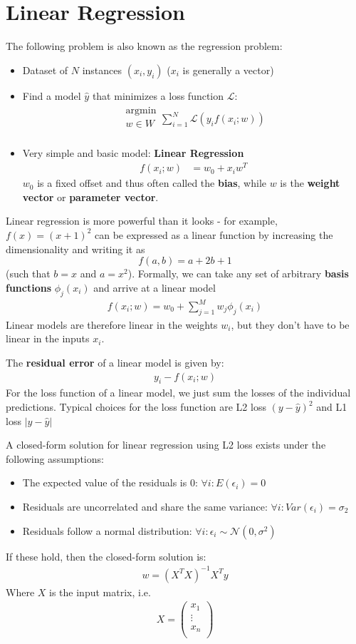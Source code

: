 \documentclass{report}
\newcommand{\tbf}{\textbf}
\newcommand{\argmin}[1] {
    \begin{array}{c}
        \text{argmin}\\
        #1\\
        \end{array}
    }
\newcommand*{\newpar}{\par\vspace{\baselineskip}\noindent}
\newcommand{\loss}{\mathcal{L}}
\newcommand{\yhat}{\hat{y}}
\begin{document}
\section{Linear Regression}
The following problem is also known as the regression problem:
\begin{itemize}
 \item Dataset of $N$ instances $(x_i, y_i)$ ($x_i$ is generally a vector) 
 \item Find a model $\yhat$ that minimizes a loss function $\loss$:
 \begin{align*}
  \argmin{w \in W} \sum_{i=1}^{N} \loss(y_i f(x_i; w))
 \end{align*}
 \item Very simple and basic model: \tbf{Linear Regression}
 \begin{align*}
  f(x_i;w) &= w_0 + x_i w^{T}
 \end{align*}
 $w_0$ is a fixed offset and thus often called the \tbf{bias}, while $w$ is the \tbf{weight vector} or \tbf{parameter vector}.
\end{itemize}
Linear regression is more powerful than it looks - for example, $f(x) = (x+1)^2$ can be expressed as a linear function by increasing the dimensionality and writing it as \[f(a,b) = a +2b + 1\] (such that $b = x$ and $a = x^2$). Formally, we can take any set of arbitrary \tbf{basis functions} $\phi_j(x_i)$ and arrive at a linear model
\begin{align*}
 f(x_i;w) = w_0 + \sum_{j=1}^{M} w_j \phi_j(x_i)
\end{align*}
Linear models are therefore linear in the weights $w_i$, but they don't have to be linear in the inputs $x_i$.
\newpar
The \tbf{residual error} of a linear model is given by:
\begin{align*}
 y_i - f(x_i;w)
\end{align*}
For the loss function of a linear model, we just sum the losses of the individual predictions. Typical choices for the loss function are L2 loss $(y-\yhat)^2$ and L1 loss $|y - \yhat|$
\newpar
A closed-form solution for linear regression using L2 loss exists under the following assumptions:
\begin{itemize}
 \item The expected value of the residuals is 0: $\forall i: E(\epsilon_i) = 0$
 \item Residuals are uncorrelated and share the same variance: $\forall i: Var(\epsilon_i) = \sigma_2$
 \item Residuals follow a normal distribution: $\forall i: \epsilon_i \sim \mathcal{N}(0,\sigma^2)$
\end{itemize}
If these hold, then the closed-form solution is:
\begin{align}
 w = (X^T X)^{-1} X^T y
\end{align}
Where $X$ is the input matrix, i.e.
\begin{align*}
X = 
\begin{pmatrix}
x_1\\
\vdots\\
x_n\\
\end{pmatrix}
\end{align*}
\end{document}

